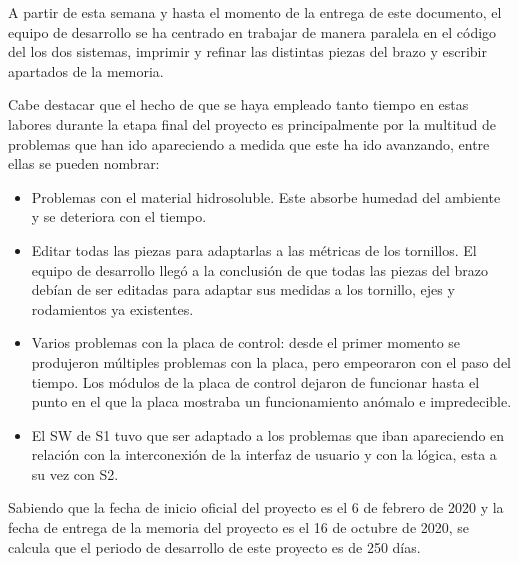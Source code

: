 A partir de esta semana y hasta el momento de la entrega de este documento, el equipo de desarrollo se ha centrado en trabajar de manera paralela en el código del los dos sistemas, imprimir y refinar las distintas piezas del brazo y escribir apartados de la memoria.

Cabe destacar que el hecho de que se haya empleado tanto tiempo en estas labores durante la etapa final del proyecto es principalmente por la multitud de problemas que han ido apareciendo a medida que este ha ido avanzando, entre ellas se pueden nombrar:

\begin{itemize}
    \item Problemas con el material hidrosoluble. Este absorbe humedad del ambiente y se deteriora con el tiempo.
    \item Editar todas las piezas para adaptarlas a las métricas de los tornillos. El equipo de desarrollo llegó a la conclusión de que todas las piezas del brazo debían de ser editadas para adaptar sus medidas a los tornillo, ejes y rodamientos ya existentes.
    \item Varios problemas con la placa de control: desde el primer momento se produjeron múltiples problemas con la placa, pero empeoraron con el paso del tiempo. Los módulos de la placa de control dejaron de funcionar hasta el punto en el que la placa mostraba un funcionamiento anómalo e impredecible.
    \item El \ac{SW} de \ac{S1} tuvo que ser adaptado a
    los problemas que iban apareciendo en relación con la interconexión de la interfaz de usuario y con la lógica, esta a su vez con \ac{S2}.
\end{itemize}

Sabiendo que la fecha de inicio oficial del proyecto es el 6 de febrero de 2020 y la fecha de entrega de la memoria del proyecto es el 16 de octubre de 2020, se calcula que el periodo de desarrollo de este proyecto es de 250 días.